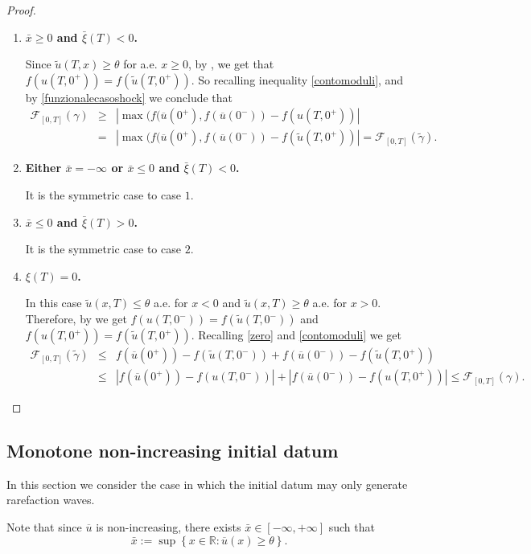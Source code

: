 \documentclass[a4paper, 10pt, final]{article}
\newcommand{\R}{\mathbb{R}} \newcommand{\N}{\mathbb{N}}
\begin{document}
\begin{proof}
\begin{enumerate}
\item  {\bf   $\bar x\geq  0$ and $\bar \xi(T)<0$.}
 
Since $\widetilde u(T, x)\geq \theta $ for a.e.  $x\geq  0$, by , we get that $f( u(T,0^+))=f( \widetilde u(T,0^+))$. So recalling inequality  \eqref{contomoduli}, and by \eqref{funzionalecasoshock} we conclude that
\begin{eqnarray*}\mathcal{F}_{[0,T]}(\gamma)&\geq& |\max(f(\overline u(0^+), f(\overline u(0^-)) - f( u(T,0^+))| \\ &=&|\max(f(\overline u(0^+), f(\overline u(0^-)) - f( \widetilde u(T,0^+))|= \mathcal{F}_{[0,T]}(\widetilde \gamma) .\end{eqnarray*}
\item  {\bf Either  $\bar x=-\infty$ or $\bar x\leq  0$ and $\bar \xi(T)<0$.}

It is the symmetric case to case $1$.
\item  {\bf   $\bar x\leq  0$ and $\bar \xi(T)>0$.}
 
It is the symmetric case to case $2$.
 
 
 
 \item  {\bf $\xi(T)=0$.} 

 In this case    $\widetilde u(x,T)\leq \theta$ a.e. for $x<0$ and $\widetilde u(x,T)\geq \theta$ a.e. for $x>0$. 
 Therefore, by  we get $f( u(T,0^-))=f( \widetilde u(T,0^-))$ and $f( u(T,0^+))=f( \widetilde u(T,0^+))$. 
 Recalling \eqref{zero} and \eqref{contomoduli}
 we get \begin{eqnarray*}
   \mathcal F_{[0,T]}(\widetilde \gamma)  
  &\leq & f(\overline u(0^+)) - f(\widetilde u(T,0^-))+f(\overline u(0^-)) - f(\widetilde u(T,0^+))\\&\leq&   |f(\overline u(0^+)) - f( u(T,0^-))| + |f(\overline u(0^-))-f(u(T,0^+))|\leq \mathcal{F}_{[0,T]}(\gamma).\end{eqnarray*} 
 \end{enumerate}
  \end{proof}
  
\subsection{Monotone non-increasing initial datum}
In this section we consider the case in which the initial datum may only generate rarefaction  waves. 


Note that since $\overline u$ is non-increasing,   there exists $\bar x\in[-\infty, +\infty]$   
such that  \begin{equation}\label{xbar2} \bar x:= \sup\left\{x \in \R: \overline u(x) \ge \theta\right\}.\end{equation}
\end{document}
